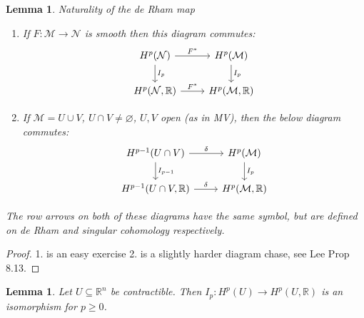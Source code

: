 \documentclass[10pt]{article}
\theoremstyle{plain}
\newtheorem{lemma}[thm]{Lemma}
\theoremstyle{definition}
\newcommand{\Real}{\mathbb{R}}
\newcommand{\man}{\mathcal{M}}
\newcommand{\nan}{\mathcal{N}}
\begin{document}
\begin{lemma}{Naturality of the de Rham map}
    \begin{enumerate}
        \item If $F:\man \to \nan$ is smooth then this diagram commutes:
            $$%
            \begin{tikzcd}
             H^p(\mathcal{N}) \arrow[d, "I_p"] \arrow[r, "F^*"] & H^p(\mathcal{M}) \arrow[d, "I_p"] \\
              {H^p(\mathcal{N},\mathbb{R})} \arrow[r, "F^*"]     & {H^p(\mathcal{M},\mathbb{R})}    
             \end{tikzcd}$$
        \item If $\man = U \cup V$, $U\cap V \neq \varnothing$, $U,V$ open (as in MV), then the below diagram commutes:
        $$
            \begin{tikzcd}
            H^{p-1}(U\cap V) \arrow[r, "\delta"] \arrow[d, "I_{p-1}"] & H^p(\mathcal{M}) \arrow[d, "I_p"] \\
            {H^{p-1}(U\cap V,\mathbb{R})} \arrow[r, "\delta"]         & {H^{p}(\mathcal{M},\mathbb{R})}  
            \end{tikzcd}$$
    \end{enumerate}
    The row arrows on both of these diagrams have the same symbol, but are defined on de Rham and singular cohomology respectively.
\end{lemma}

\begin{proof}
    1. is an easy exercise 2. is a slightly harder diagram chase, see Lee Prop 8.13.
\end{proof}

\begin{lemma}
    Let $U\subseteq\Real^n$ be contractible. Then $I_p: H^p(U) \to H^p(U,\Real)$ is an isomorphism for $p \geq 0$.
\end{lemma}
\end{document}

